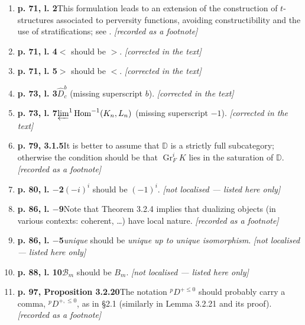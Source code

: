\documentclass[12pt,oneside]{amsbook}
\theoremstyle{plain}
\theoremstyle{definition}
\newcommand{\DD}{\mathbb{D}}
\DeclareMathOperator{\Hom}{Hom}
\DeclareMathOperator{\Gr}{Gr}
\begin{document}
\begin{enumerate}[label={\arabic*.},leftmargin=2.6em,itemsep=4pt]
\item \textbf{p. 71, l. 2}\quad This formulation leads to an extension of the construction of $t$-structures associated to perversity functions, avoiding constructibility and the use of stratifications; see \cite{Gab04}. \hfill\newline \textsl{[recorded as a footnote]}
\item \textbf{p. 71, l. 4}\quad $<$ should be $>$. \hfill\newline \textsl{[corrected in the text]}
\item \textbf{p. 71, l. 5}\quad $>$ should be $<$. \hfill\newline \textsl{[corrected in the text]}
\item \textbf{p. 73, l. 3}\quad $\widehat{D}^{b}_{c}$ (missing superscript $b$). \hfill\newline \textsl{[corrected in the text]}
\item \textbf{p. 73, l. 7}\quad $\varprojlim^{1}\Hom^{-1}(K_{n},L_{n})$ (missing superscript $-1$). \hfill\newline \textsl{[corrected in the text]}
\item \textbf{p. 79, 3.1.5}\quad It is better to assume that $\DD$ is a strictly full subcategory; otherwise the condition should be that $\Gr^{i}_{F}K$ lies in the saturation of $\DD$. \hfill\newline \textsl{[recorded as a footnote]}
\item \textbf{p. 80, l. $-$2}\quad $(-i)^{i}$ should be $(-1)^{i}$. \hfill\newline \textsl{[not localised --- listed here only]}
\item \textbf{p. 86, l. $-$9}\quad Note that Theorem 3.2.4 implies that dualizing objects (in various contexts: coherent, \dots) have local nature. \hfill\newline \textsl{[recorded as a footnote]}
\item \textbf{p. 86, l. $-$5}\quad \emph{unique} should be \emph{unique up to unique isomorphism}. \hfill\newline \textsl{[not localised --- listed here only]}
\item \textbf{p. 88, l. 10}\quad $\mathcal{B}_{m}$ should be $B_{m}$. \hfill\newline \textsl{[not localised --- listed here only]}
\item \textbf{p. 97, Proposition 3.2.20}\quad The notation ${}^{p}D^{+\leq0}$ should probably carry a comma, ${}^{p}D^{+,\leq0}$, as in \S2.1 (similarly in Lemma 3.2.21 and its proof). \hfill\newline \textsl{[recorded as a footnote]}

\end{enumerate}
\end{document}
